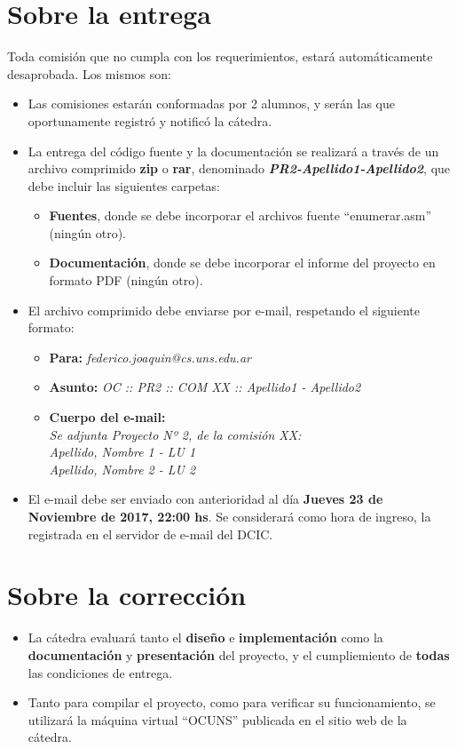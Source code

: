 \documentclass[12pt,a4paper]{article}
\begin{document}
\section*{Sobre la entrega}
Toda comisión que no cumpla con los requerimientos, estará automáticamente desaprobada. Los mismos son:
\begin{itemize}
		
	\item Las comisiones estarán conformadas por 2 alumnos, y serán las que oportunamente registró y notificó la cátedra.
		
	\item La entrega del código fuente y la documentación se realizará a través de un archivo comprimido \textbf{zip} o \textbf{rar}, denominado \textbf{\textit{PR2-Apellido1-Apellido2}}, que debe incluir las siguientes carpetas:
	\begin{itemize}
		\item \textbf{Fuentes}, donde se debe incorporar el archivos fuente “enumerar.asm” (ningún otro).
		\item \textbf{Documentación}, donde se debe incorporar el informe del proyecto en formato PDF (ningún otro).
	\end{itemize}		
	\item El archivo comprimido debe enviarse por e-mail, respetando el siguiente formato: 
	\begin{itemize}
		\item \textbf{Para:} \textit{federico.joaquin@cs.uns.edu.ar}
		\item \textbf{Asunto:} \textit{OC :: PR2 :: COM XX :: Apellido1 - Apellido2}
		\item \textbf{Cuerpo del e-mail:} \\
		\textit{Se adjunta Proyecto Nº 2, de la comisión XX: } \\
		\textit{Apellido, Nombre 1 - LU 1} \\
		\textit{Apellido, Nombre 2 - LU 2}
	\end{itemize}
	
	\item El e-mail debe ser enviado con anterioridad al día \textbf{Jueves 23 de Noviembre de 2017, 22:00 hs}. Se considerará como hora de ingreso, la registrada en el servidor de e-mail del DCIC.
		
\end{itemize}

\section*{Sobre la corrección}

\begin{itemize}
	
	\item La cátedra evaluará tanto el \textbf{diseño} e \textbf{implementación}
	como la \textbf{documentación} y \textbf{presentación} del proyecto, y el cumpliemiento de \textbf{todas} las condiciones de entrega.
	
	\item Tanto para compilar el proyecto, como para verificar su funcionamiento, se utilizará la máquina virtual “OCUNS” publicada en el sitio web de la cátedra.
	
\end{itemize}
\end{document}
